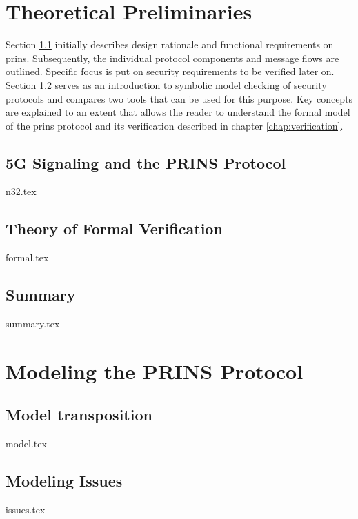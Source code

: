 \documentclass[a4paper,12pt,twoside]{report}
\begin{document}
\clearpage

\chapter{Theoretical Preliminaries}
\label{chap:theory}

Section \ref{sec:n32} initially describes design rationale and functional requirements on \gls{prins}.
Subsequently, the individual protocol components and message flows are outlined.
Specific focus is put on security requirements to be verified later on.
Section \ref{sec:formal} serves as an introduction to symbolic model checking of security protocols and compares two tools that can be used for this purpose.
Key concepts are explained to an extent that allows the reader to understand the formal model of the \gls{prins} protocol and its verification described in chapter \ref{chap:verification}.

\section{5G Signaling and the PRINS Protocol}
\label{sec:n32}
{n32.tex}

\section{Theory of Formal Verification}
\label{sec:formal}
{formal.tex}

\section{Summary}
\label{sec:summary}
{summary.tex}

\clearpage

\chapter{Modeling the PRINS Protocol}
\label{chap:modeling}

\section{Model transposition}
\label{sec:model}
{model.tex}

\section{Modeling Issues}
\label{sec:issues}
{issues.tex}
\end{document}
